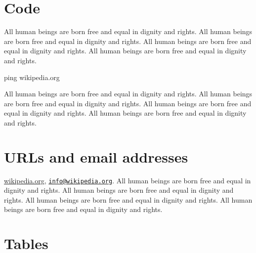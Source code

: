 \documentclass[
  ngerman,
  american,
  titlepage,
  openright,
  DIV=calc,
  toc=listof,
  listof=nochaptergap]{scrbook}
\newenvironment{Shaded}{}{}
\newcommand{\FunctionTok}[1]{\textcolor[rgb]{0.02,0.16,0.49}{#1}}
\newcommand{\NormalTok}[1]{#1}
\begin{document}
\section{Code}\label{code}

All human beings are born free and equal in dignity and rights. All
human beings are born free and equal in dignity and rights. All human
beings are born free and equal in dignity and rights. All human beings
are born free and equal in dignity and rights.

\begin{Shaded}
\begin{Highlighting}[]
\FunctionTok{ping}\NormalTok{ wikipedia.org}
\end{Highlighting}
\end{Shaded}

All human beings are born free and equal in dignity and rights. All
human beings are born free and equal in dignity and rights. All human
beings are born free and equal in dignity and rights. All human beings
are born free and equal in dignity and rights.

\section{URLs and email addresses}\label{urls-and-email-addresses}

\href{https://www.wikipedia.org/}{wikipedia.org},
\href{mailto:info@wikipedia.org}{\nolinkurl{info@wikipedia.org}}. All
human beings are born free and equal in dignity and rights. All human
beings are born free and equal in dignity and rights. All human beings
are born free and equal in dignity and rights. All human beings are born
free and equal in dignity and rights.

\section{Tables}\label{tables}
\end{document}
